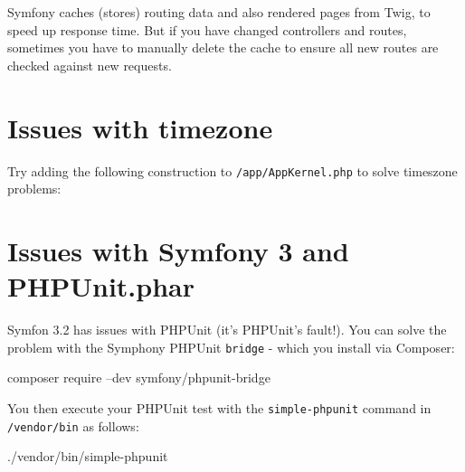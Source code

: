 \documentclass[a4paperpaper,openright]{book}
\newenvironment{Shaded}{}{}
\newcommand{\ExtensionTok}[1]{#1}
\newcommand{\FunctionTok}[1]{\textcolor[rgb]{0.02,0.16,0.49}{#1}}
\newcommand{\KeywordTok}[1]{\textcolor[rgb]{0.00,0.44,0.13}{\textbf{#1}}}
\newcommand{\NormalTok}[1]{#1}
\newcommand{\OtherTok}[1]{\textcolor[rgb]{0.00,0.44,0.13}{#1}}
\newcommand{\StringTok}[1]{\textcolor[rgb]{0.25,0.44,0.63}{#1}}
\begin{document}
Symfony caches (stores) routing data and also rendered pages from Twig,
to speed up response time. But if you have changed controllers and
routes, sometimes you have to manually delete the cache to ensure all
new routes are checked against new requests.

\hypertarget{issues-with-timezone}{%
\section{Issues with timezone}\label{issues-with-timezone}}

Try adding the following construction to \texttt{/app/AppKernel.php} to
solve timeszone problems:

\begin{Shaded}
\end{Shaded}

\hypertarget{issues-with-symfony-3-and-phpunit.phar}{%
\section{Issues with Symfony 3 and
PHPUnit.phar}\label{issues-with-symfony-3-and-phpunit.phar}}

Symfon 3.2 has issues with PHPUnit (it's PHPUnit's fault!). You can
solve the problem with the Symphony PHPUnit \texttt{bridge} - which you
install via Composer:

\begin{Shaded}
\begin{Highlighting}[]
    \ExtensionTok{composer}\NormalTok{ require --dev symfony/phpunit-bridge}
\end{Highlighting}
\end{Shaded}

You then execute your PHPUnit test with the \texttt{simple-phpunit}
command in \texttt{/vendor/bin} as follows:

\begin{Shaded}
\begin{Highlighting}[]
    \ExtensionTok{./vendor/bin/simple-phpunit}
\end{Highlighting}
\end{Shaded}
\end{document}
